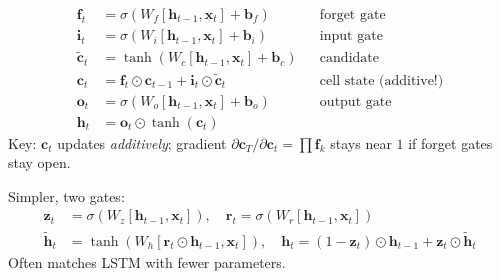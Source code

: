 \begin{definition}
\begin{align}
\mathbf{f}_t&=\sigma(W_f[\mathbf{h}_{t-1},\mathbf{x}_t]+\mathbf{b}_f) &&\text{forget gate}\\
\mathbf{i}_t&=\sigma(W_i[\mathbf{h}_{t-1},\mathbf{x}_t]+\mathbf{b}_i) &&\text{input gate}\\
\tilde{\mathbf{c}}_t&=\tanh(W_c[\mathbf{h}_{t-1},\mathbf{x}_t]+\mathbf{b}_c) &&\text{candidate}\\
\mathbf{c}_t&=\mathbf{f}_t\odot\mathbf{c}_{t-1}+\mathbf{i}_t\odot\tilde{\mathbf{c}}_t &&\text{cell state (additive!)}\\
\mathbf{o}_t&=\sigma(W_o[\mathbf{h}_{t-1},\mathbf{x}_t]+\mathbf{b}_o) &&\text{output gate}\\
\mathbf{h}_t&=\mathbf{o}_t\odot\tanh(\mathbf{c}_t)
\end{align}
Key: $\mathbf{c}_t$ updates \emph{additively}; gradient $\partial\mathbf{c}_T/\partial\mathbf{c}_t=\prod \mathbf{f}_k$ stays near $1$ if forget gates stay open.
\end{definition}

\begin{definition}
Simpler, two gates:
\begin{align}
\mathbf{z}_t&=\sigma(W_z[\mathbf{h}_{t-1},\mathbf{x}_t]),\quad \mathbf{r}_t=\sigma(W_r[\mathbf{h}_{t-1},\mathbf{x}_t])\\
\tilde{\mathbf{h}}_t&=\tanh(W_h[\mathbf{r}_t\odot\mathbf{h}_{t-1},\mathbf{x}_t]),\quad \mathbf{h}_t=(1-\mathbf{z}_t)\odot\mathbf{h}_{t-1}+\mathbf{z}_t\odot\tilde{\mathbf{h}}_t
\end{align}
Often matches LSTM with fewer parameters.
\end{definition}

